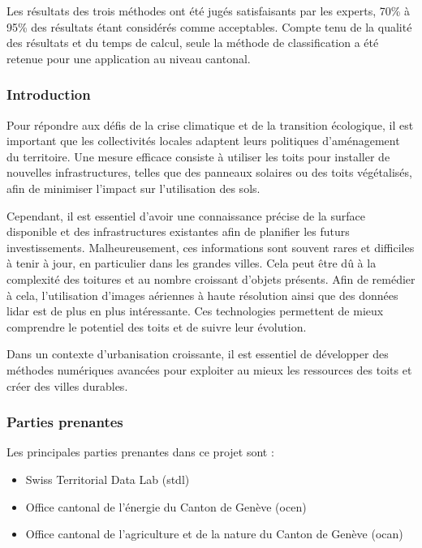 \par{Les résultats des trois méthodes ont été jugés satisfaisants par les experts, 70\% à 95\% des résultats étant considérés comme acceptables. Compte tenu de la qualité des résultats et du temps de calcul, seule la méthode de classification a été retenue pour une application au niveau cantonal.}

\subsubsection{Introduction}

\par{Pour répondre aux défis de la crise climatique et de la transition écologique, il est important que les collectivités locales adaptent leurs politiques d'aménagement du territoire. Une mesure efficace consiste à utiliser les toits pour installer de nouvelles infrastructures, telles que des panneaux solaires ou des toits végétalisés, afin de minimiser l'impact sur l'utilisation des sols.}
\par{Cependant, il est essentiel d'avoir une connaissance précise de la surface disponible et des infrastructures existantes afin de planifier les futurs investissements. Malheureusement, ces informations sont souvent rares et difficiles à tenir à jour, en particulier dans les grandes villes. Cela peut être dû à la complexité des toitures et au nombre croissant d'objets présents. Afin de remédier à cela, l'utilisation d'images aériennes à haute résolution ainsi que des données \gls{lidar} est de plus en plus intéressante. Ces technologies permettent de mieux comprendre le potentiel des toits et de suivre leur évolution.}
\par{Dans un contexte d'urbanisation croissante, il est essentiel de développer des méthodes numériques avancées pour exploiter au mieux les ressources des toits et créer des villes durables.}

\subsubsection{Parties prenantes}

\par{Les principales parties prenantes dans ce projet sont :}
\begin{itemize}
\item Swiss Territorial Data Lab (\acrshort{stdl})
\item Office cantonal de l'énergie du Canton de Genève (\acrshort{ocen})
\item Office cantonal de l'agriculture et de la nature du Canton de Genève (\acrshort{ocan})
\end{itemize}

